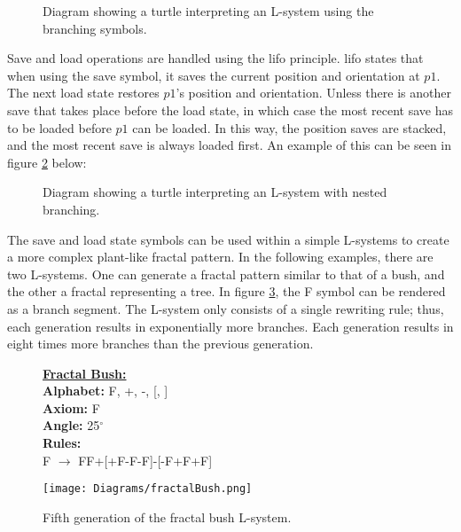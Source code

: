 \begin{figure}[htbp]
	{\centering
		\setlength{\fboxrule}{1pt}
		\vspace{7px}
		\caption{Diagram showing a turtle interpreting an L-system using the branching symbols.} \label{branching 1}
	}
\end{figure}
\FloatBarrier

\noindent
Save and load operations are handled using the \acrfull{lifo} principle. \acrshort{lifo} states that when using the save symbol, it saves the current position and orientation at $p1$. The next load state restores $p1$'s position and orientation. Unless there is another save that takes place before the load state, in which case the most recent save has to be loaded before $p1$ can be loaded. In this way, the position saves are stacked, and the most recent save is always loaded first. An example of this can be seen in figure \ref{branching 2} below:

\begin{figure}[htbp]
	{\centering
		\setlength{\fboxrule}{1pt}
		\vspace{7px}
		\caption{Diagram showing a turtle interpreting an L-system with nested branching.} \label{branching 2}
	}
\end{figure}
\FloatBarrier

\noindent
The save and load state symbols can be used within a simple L-systems to create a more complex plant-like fractal pattern. In the following examples, there are two L-systems. One can generate a fractal pattern similar to that of a bush, and the other a fractal representing a tree. In figure \ref{fractal bush}, the F symbol can be rendered as a branch segment. The L-system only consists of a single rewriting rule; thus, each generation results in exponentially more branches. Each generation results in eight times more branches than the previous generation. 

\begin{figure}[htbp]
	\raggedright
	\textbf{\underline{Fractal Bush:}} \\
	\textbf{Alphabet:} F, +, -, [, ] \\
	\textbf{Axiom:} F \\
	\textbf{Angle:} 25$^\circ$ \\
	\textbf{Rules:} \\
	F $\rightarrow$ FF+[+F-F-F]-[-F+F+F]\\
	{\centering
		\vspace{7px}
		\texttt{[image: Diagrams/fractalBush.png]}
		\caption{Fifth generation of the fractal bush L-system.} \label{fractal bush}
	}
\end{figure}
\FloatBarrier

